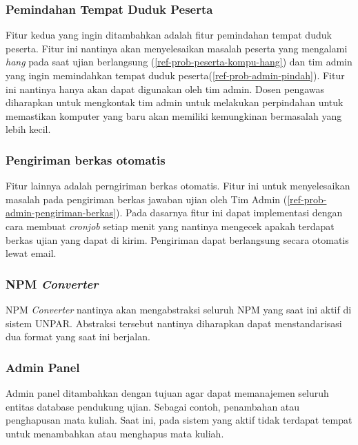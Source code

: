     \subsubsection{Pemindahan Tempat Duduk Peserta}
        Fitur kedua yang ingin ditambahkan adalah fitur pemindahan tempat duduk
        peserta. Fitur ini nantinya akan
        menyelesaikan masalah peserta yang mengalami \textit{hang} pada saat
        ujian berlangsung (\ref{ref-prob-peserta-kompu-hang}) dan tim admin yang
        ingin memindahkan tempat duduk peserta(\ref{ref-prob-admin-pindah}). Fitur ini nantinya hanya
        akan dapat digunakan oleh tim admin. Dosen pengawas diharapkan untuk
        mengkontak tim admin untuk melakukan perpindahan untuk memastikan
        komputer yang baru akan memiliki kemungkinan bermasalah yang lebih
        kecil.

    \subsubsection{Pengiriman berkas otomatis}
        Fitur lainnya adalah perngiriman berkas otomatis. Fitur ini untuk
        menyelesaikan masalah pada pengiriman berkas jawaban ujian oleh Tim
        Admin (\ref{ref-prob-admin-pengiriman-berkas}). Pada dasarnya fitur ini
        dapat implementasi dengan cara membuat \textit{cronjob} setiap menit
        yang nantinya mengecek apakah terdapat berkas ujian yang dapat di kirim.
        Pengiriman dapat berlangsung secara otomatis lewat email.

    \subsubsection{NPM \textit{Converter}} NPM \textit{Converter} nantinya akan
        mengabstraksi seluruh NPM yang saat ini aktif di sistem UNPAR. Abstraksi
        tersebut nantinya diharapkan dapat menstandarisasi dua format yang saat
        ini berjalan.
        
    \subsubsection{Admin Panel}
        Admin panel ditambahkan dengan tujuan agar dapat memanajemen seluruh
        entitas database pendukung ujian. Sebagai contoh, penambahan atau
        penghapusan mata kuliah. Saat ini, pada sistem yang aktif tidak terdapat
        tempat untuk menambahkan atau menghapus mata kuliah.
    
